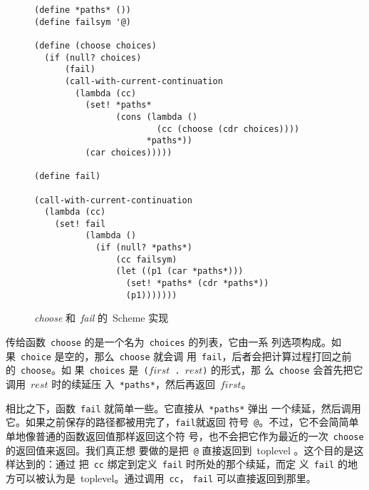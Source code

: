 \begin{figure}
\begin{lstlisting}
(define *paths* ())
(define failsym '@)

(define (choose choices)
  (if (null? choices)
      (fail)
      (call-with-current-continuation
        (lambda (cc)
          (set! *paths*
                (cons (lambda ()
                        (cc (choose (cdr choices))))
                      *paths*))
          (car choices)))))

(define fail)

(call-with-current-continuation
  (lambda (cc)
    (set! fail
          (lambda ()
            (if (null? *paths*)
                (cc failsym)
                (let ((p1 (car *paths*)))
                  (set! *paths* (cdr *paths*))
                  (p1)))))))
\end{lstlisting}
\caption{\emph{choose} 和~\emph{fail} 的~Scheme 实现}
\label{fig:scheme_implementation_of_choose_and_fail}
\end{figure}

传给函数~\texttt{choose} 的是一个名为~\texttt{choices} 的列表，它由一系
列选项构成。如果~\texttt{choice} 是空的，那么~\texttt{choose} 就会调
用~\texttt{fail}，后者会把计算过程打回之前的~\texttt{choose}。如
果~\texttt{choices} 是~\texttt{($first$ . $rest$)} 的形式，那
么~\texttt{choose} 会首先把它调用~$rest$ 时的续延压
入~\texttt{*paths*}，然后再返回~$first$。

相比之下，函数~\texttt{fail} 就简单一些。它直接从~\texttt{*paths*} 弹出
一个续延，然后调用它。如果之前保存的路径都被用完了，\texttt{fail}就返回
符号~\texttt{@}。不过，它不会简简单单地像普通的函数返回值那样返回这个符
号，也不会把它作为最近的一次~\texttt{choose} 的返回值来返回。我们真正想
要做的是把~\texttt{@} 直接返回到~toplevel
 。这个目的是这样达到的：通过
把~\texttt{cc} 绑定到定义~\texttt{fail} 时所处的那个续延，而定
义~\texttt{fail} 的地方可以被认为是~toplevel。通过调用~\texttt{cc}，
\texttt{fail} 可以直接返回到那里。


